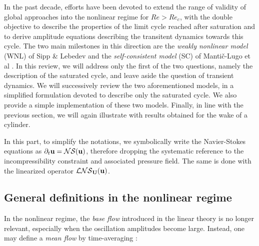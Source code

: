 \documentclass[twocolumn,10pt]{asme2ej}
\begin{document}

In the past decade, efforts have been devoted to extend the range of validity of global approaches into the nonlinear regime for $Re>Re_c$, with the double objective to describe the properties of the limit cycle reached after saturation and to derive amplitude equations describing the transitent dynamics towards this cycle. The two main milestones in this direction  are the {\em weakly nonlinear model}  (WNL) of Sipp \& Lebedev \cite{SippLebedev} and the {\em self-consistent model} (SC) of Manti\v{c}-Lugo et al \cite{MLugo2014}.
 In this review, we will address only the first of the two questions, namely  the description of the saturated cycle, and leave aside the question of transient dynamics. We will successively review the two aforementioned models, in a simplified formulation devoted to describe only the saturated cycle. We also provide a simple implementation of these two models. Finally, in line with the previous section, we will again illustrate with results obtained for the wake of a cylinder.
  
 In this part, to simplify the notations, we symbolically write the Navier-Stokes equations as $\partial_t {\bf u} = {\cal NS} ({\bf u})$, therefore dropping the systematic reference to the incompressibility constraint and associated pressure field. The same is done with the linearized operator ${\cal LNS}_{{\bf U}}( {\bf u})$. 

\subsection{General definitions in the nonlinear regime}



In the nonlinear regime, the {\em base flow} introduced in the linear theory is no longer relevant, especially when the oscillation amplitudes become large. 
Instead, one may define a {\em mean flow} by time-averaging : 
\end{document}
